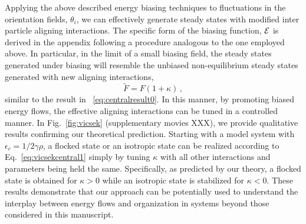 \documentclass[superscriptaddress, twocolumn, prx, longbibliography, nofootinbib]{revtex4-1}
\begin{document}
Applying the above described energy biasing techniques to fluctuations in the orientation fields, $\theta_i$, we can effectively generate steady states with modified inter particle aligning interactions. The specific form of the biasing function, $\cal E$ is derived in the appendix following a procedure analogous to the one employed above. In particular, in the limit of a small biasing field, the steady states generated under biasing will resemble the unbiased non-equilibrium steady states generated with new aligning interactions, 
\begin{equation}
\label{eq:vicsekcentral1}
\tilde F=F(1+\kappa)\,,
\end{equation}
similar to the result in ~\eqref{eq:centralresult0}. In this manner, by promoting biased energy flows, the effective aligning interactions can be tuned in a controlled manner. In Fig.~\ref{fig:vicsek} (supplementary movies XXX), we provide qualitative results confirming our theoretical prediction. Starting with a model system with $\epsilon_c=1/2 \gamma \rho$, a flocked state or an isotropic state can be realized according to Eq.~\ref{eq:vicsekcentral1} simply by tuning $\kappa$ with all other interactions and parameters being held the same. Specifically, as predicted by our theory, a flocked state is obtained for $\kappa>0$ while an isotropic state is stabilized for $\kappa<0$. These results demonstrate that our approach can be potentially used to understand the interplay between energy flows and organization in systems beyond those considered in this manuscript. 
\end{document}

